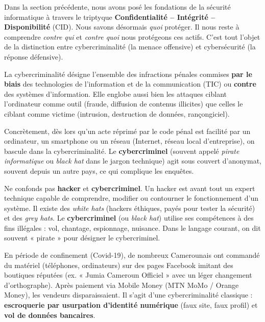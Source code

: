 \documentclass[11pt]{article}
\newcommand{\cle}[1]{{\popxbold\color{popdark}#1}}
\newcounter{popsec}
\newcounter{popsub}
\newcommand{\courssub}[1]{%
  \stepcounter{popsub}%
  \par\vspace{9pt}\noindent{\popxbold\fontsize{11.5}{13}\selectfont\color{popink}{\color{poporange}\thepopsec.\thepopsub}\hspace{6pt}#1}\par\nopagebreak\vspace{4pt}
}
\begin{document}
Dans la section précédente, nous avons posé les fondations de la sécurité informatique à travers le triptyque \textbf{Confidentialité -- Intégrité -- Disponibilité} (CID). Nous savons désormais \emph{quoi} protéger. Il nous reste à comprendre \emph{contre qui} et \emph{contre quoi} nous protégeons ces actifs. C'est tout l'objet de la distinction entre cybercriminalité (la menace offensive) et cybersécurité (la réponse défensive).

\courssub{Définition et portée de la cybercriminalité}

\begin{definition}[Cybercriminalité]
La \cle{cybercriminalité} désigne l'ensemble des infractions pénales commises \textbf{par le biais} des technologies de l'information et de la communication (TIC) ou \textbf{contre} des systèmes d'information. Elle englobe aussi bien les attaques ciblant l'ordinateur comme outil (fraude, diffusion de contenus illicites) que celles le ciblant comme victime (intrusion, destruction de données, rançongiciel).
\end{definition}

Concrètement, dès lors qu'un acte réprimé par le code pénal est facilité par un ordinateur, un smartphone ou un réseau (Internet, réseau local d'entreprise), on bascule dans la cybercriminalité. Le \textbf{cybercriminel} (souvent appelé \emph{pirate informatique} ou \emph{black hat} dans le jargon technique) agit sous couvert d'anonymat, souvent depuis un autre pays, ce qui complique les enquêtes.

\begin{attention}[Hacker \texorpdfstring{$\neq$}{!=} Cybercriminel]
Ne confonds pas \textbf{hacker} et \textbf{cybercriminel}. Un \cle{hacker} est avant tout un expert technique capable de comprendre, modifier ou contourner le fonctionnement d'un système. Il existe des \emph{white hats} (hackers éthiques, payés pour tester la sécurité) et des \emph{grey hats}. Le \textbf{cybercriminel} (ou \emph{black hat}) utilise ses compétences à des fins illégales : vol, chantage, espionnage, nuisance. Dans le langage courant, on dit souvent « pirate » pour désigner le cybercriminel.
\end{attention}

\begin{exemplebox}
En période de confinement (Covid-19), de nombreux Camerounais ont commandé du matériel (téléphones, ordinateurs) sur des pages Facebook imitant des boutiques réputées (ex. « Jumia Cameroun Officiel » avec un léger changement d'orthographe). Après paiement via Mobile Money (MTN MoMo / Orange Money), les vendeurs disparaissaient. Il s'agit d'une cybercriminalité classique : \textbf{escroquerie par usurpation d'identité numérique} (faux site, faux profil) et \textbf{vol de données bancaires}.
\end{exemplebox}
\end{document}
